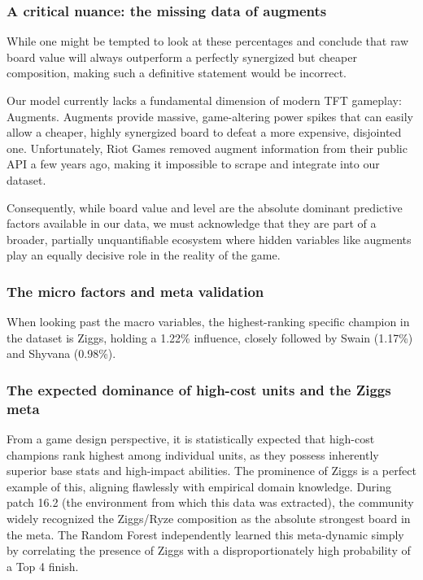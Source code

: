 \documentclass[12pt,a4paper]{extarticle}
\begin{document}
\subsubsection{A critical nuance: the missing data of augments}
While one might be tempted to look at these percentages and conclude that raw board value will always outperform a perfectly synergized but cheaper composition, making such a definitive statement would be incorrect.

Our model currently lacks a fundamental dimension of modern TFT gameplay: Augments. Augments provide massive, game-altering power spikes that can easily allow a cheaper, highly synergized board to defeat a more expensive, disjointed one. Unfortunately, Riot Games removed augment information from their public API a few years ago, making it impossible to scrape and integrate into our dataset.

Consequently, while board value and level are the absolute dominant predictive factors available in our data, we must acknowledge that they are part of a broader, partially unquantifiable ecosystem where hidden variables like augments play an equally decisive role in the reality of the game.

\subsubsection{The micro factors and meta validation}
When looking past the macro variables, the highest-ranking specific champion in the dataset is Ziggs, holding a 1.22\% influence, closely followed by Swain (1.17\%) and Shyvana (0.98\%).

\subsubsection{The expected dominance of high-cost units and the Ziggs meta}
From a game design perspective, it is statistically expected that high-cost champions rank highest among individual units, as they possess inherently superior base stats and high-impact abilities. The prominence of Ziggs is a perfect example of this, aligning flawlessly with empirical domain knowledge. During patch 16.2 (the environment from which this data was extracted), the community widely recognized the Ziggs/Ryze composition as the absolute strongest board in the meta. The Random Forest independently learned this meta-dynamic simply by correlating the presence of Ziggs with a disproportionately high probability of a Top 4 finish.
\end{document}
